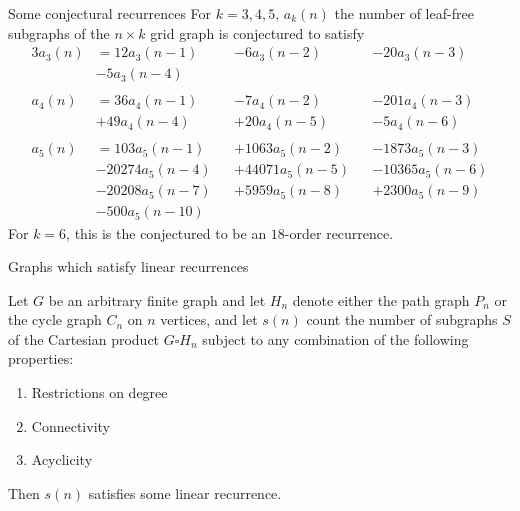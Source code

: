 \documentclass{beamer}%
\begin{document}
\begin{frame}{Some conjectural recurrences}
  For $k = 3, 4, 5$, $a_k(n)$ the number of leaf-free subgraphs of the $n \times k$
  grid graph is conjectured to satisfy
  \begin{alignat*}{3}
     a_3(n) &= 12a_3(n-1)  &&-     6a_3(n-2) &&-    20a_3(n-3) \\
           &-  5a_3(n-4)  && &&
    \\~\\
    a_4(n) &= 36a_4(n-1)  &&-     7a_4(n-2) &&-   201a_4(n-3) \\
           &+ 49a_4(n-4)  &&+    20a_4(n-5) &&-     5a_4(n-6) \\
    \\
    a_5(n) &=   103a_5(n-1) &&+  1063a_5(n-2) &&-  1873a_5(n-3) \\
           &- 20274a_5(n-4) &&+ 44071a_5(n-5) &&- 10365a_5(n-6) \\
           &- 20208a_5(n-7) &&+ 5959a_5(n-8)  &&+  2300a_5(n-9) \\
           &- 500a_5(n-10)  &&                &&
  \end{alignat*}
  For $k = 6$, this is the conjectured to be an $18$-order recurrence.
\end{frame}

\begin{frame}{Graphs which satisfy linear recurrences}
  
  \begin{theorem}[Faase, 1994] %
    Let $G$ be an arbitrary finite graph and let $H_n$ denote either the path
    graph $P_n$ or the cycle graph $C_n$ on $n$ vertices, and let $s(n)$
    count the number of subgraphs $S$ of the Cartesian product $G \square H_n$
    subject to any combination of the following properties:
    \begin{enumerate}
      \item Restrictions on degree
      \item Connectivity
      \item Acyclicity
    \end{enumerate}
    Then $s(n)$ satisfies some linear recurrence.
  \end{theorem}
\end{frame}
\end{document}
